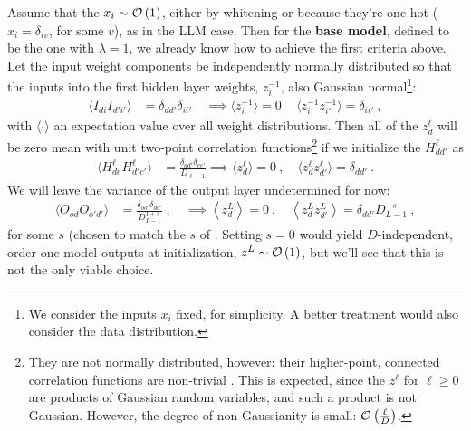 Assume that the $ x _{i  } \sim \mathcal{O} \left( 1 \right)  $, either by whitening or because they're
one-hot ($ x_{ i }=\delta_{ iv } $, for some $ v $), as in the LLM case. Then for the \textbf{base
model}, defined to be the one with $ \lambda =1 $, we already know how to achieve the first criteria
above. Let the input weight components be independently normally distributed so that the inputs into
the first hidden layer weights, $ z^{ -1 }_{ i } $, also Gaussian normal\footnote{We consider the
inputs $ x_{ i } $ fixed, for simplicity. A better treatment would also consider the data
distribution.}:
\begin{align}
   \langle  I_{ d i }I_{ d'i' } \rangle  &=  \delta_{ dd' }\delta _{ ii' }  \quad \implies
    \langle z^{  -1 }_{ i } \rangle=0 \, \quad  \langle z^{  -1 }_{ i }z^{ -1 }_{ i'} \rangle  = \delta_{ ii' }\ ,
\end{align}
with $ \langle \cdot  \rangle $ an expectation value over all weight distributions. Then all of the
$ z^{ \ell }_{ d } $ will be zero mean with unit two-point correlation functions\footnote{They are
    not normally distributed, however: their higher-point, connected correlation functions are
    non-trivial \cite{physicalDL}. This is expected, since the $ z^{ \ell }  $ for $ \ell \ge 0 $
are products of Gaussian random variables, and such a product is not Gaussian. However, the degree
of non-Gaussianity is small: $ \mathcal{O} \left( \frac{ \ell }{ D } \right)  $.} if we initialize the $
H^{ \ell }_{ dd' } $ as
\begin{align}
    \langle H^{ \ell }_{ de }H^{ \ell }_{ d'e' } \rangle &=\frac{ \delta _{ dd' }\delta _{ ee' } }{
    D_{ \ell-1 } } \implies \langle z^{\ell}_{ d } \rangle =0 \ , \quad \langle z^{\ell}_{ d }z^{ \ell }_{ d'} \rangle  = \delta_{ dd' } \ .
\end{align}
We will leave the variance of the output layer undetermined for now:
\begin{align}
    \langle O _{ od }O_{ o'd' } \rangle &= \frac{ \delta _{ oo' }\delta _{ dd' } }{ D_{ L-1 }^{ 1+s } }
    \ , \quad \implies \left\langle z^{ L }_{ d } \right\rangle= 0 \ , \quad \left\langle z^{ L }_{ d }z^{ L }_{ d' } \right\rangle= \delta_{ dd' }D_{ L-1 }^{ -s } \ ,
\end{align}
for some $ s $ (chosen to match the $ s $ of
\cite{yaida2022metaprincipledfamilyhyperparameterscaling}. Setting $ s=0 $ would yield $ D
$-independent,  order-one model outputs at initialization, $ z^{ L }\sim \mathcal{O} \left( 1 \right)  $,
but we'll see that this is not the only viable choice.

